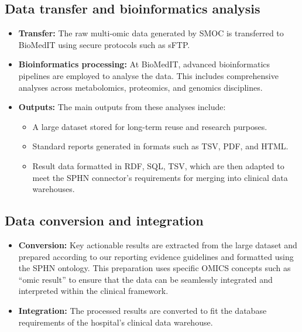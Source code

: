 \subsection{Data transfer and bioinformatics analysis}
\begin{itemize}
    \item \textbf{Transfer:} The raw multi-omic data generated by SMOC is transferred to BioMedIT using secure protocols such as sFTP.
    \item \textbf{Bioinformatics processing:} At BioMedIT, advanced bioinformatics pipelines are employed to analyse the data. This includes comprehensive analyses across metabolomics, proteomics, and genomics disciplines.
    \item \textbf{Outputs:} The main outputs from these analyses include:
    \begin{itemize}
        \item A large dataset stored for long-term reuse and research purposes.
        \item Standard reports generated in formats such as TSV, PDF, and HTML.
        \item Result data formatted in RDF, SQL, TSV, which are then adapted to meet the SPHN connector’s requirements for merging into clinical data warehouses.
    \end{itemize}
\end{itemize}

\subsection{Data conversion and integration}
\begin{itemize}
    \item \textbf{Conversion:} Key actionable results are extracted from the large dataset and prepared according to our reporting evidence guidelines and formatted using the SPHN ontology. This preparation uses specific OMICS concepts such as ``omic result'' to ensure that the data can be seamlessly integrated and interpreted within the clinical framework.
    \item \textbf{Integration:} The processed results are converted to fit the database requirements of the hospital’s clinical data warehouse.
\end{itemize}

